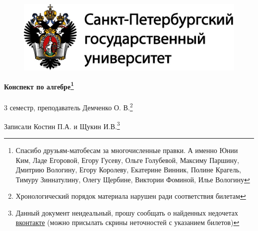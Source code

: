 \documentclass[main]{subfiles}
\begin{document}
	\begin{figure}[H]
			\includegraphics[width=12cm]{../../../template/spsu.jpg}
			\centering
	\end{figure}
	\vspace*{\fill}
	\begin{center}
		\huge \textbf{Конспект по алгебре\footnote{Спасибо друзьям-матобесам за многочисленные правки. А именно Юнии Ким, Ладе Егоровой, Егору Гусеву, Ольге Голубевой, Максиму Паршину, Дмитрию Вологину, Егору Королеву, Екатерине Винник, Полине Крагель, Тимуру Зиннатулину, Олегу Щербине, Виктории Фоминой, Илье Вологину}}\\ \ \\
		\Large 3 семестр, преподаватель Демченко О. В.\footnote{Хронологический порядок материала нарушен ради соответствия билетам}

		\large Записали Костин П.А. и Щукин И.В.\footnote{Данный документ неидеальный, прошу сообщать о найденных недочетах \href{https://vk.com/drab_existence_a}{вконтакте} (можно присылать скрины неточностей с указанием билетов)}
	\end{center}
	\vspace*{\fill}
	\vspace*{\fill}

	\newpage
	\tableofcontents
	\newpage
\end{document}
